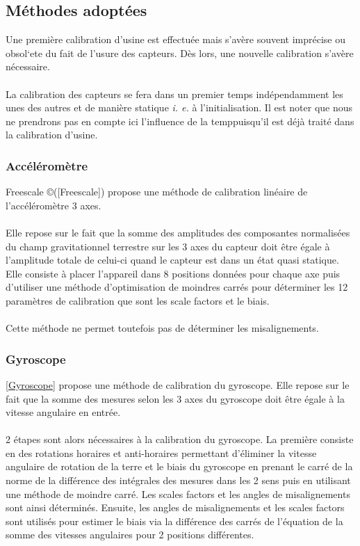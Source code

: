 \subsection{M\'ethodes adopt\'ees}

	Une premi\`ere calibration d'usine est effectu\'ee mais s'av\`ere souvent impr\'ecise ou obsol`ete du fait de l'usure des capteurs. D\`es lors, une nouvelle calibration s'av\`ere n\'ecessaire.
\\
\\
	La calibration des capteurs se fera dans un premier temps ind\'ependamment les unes des autres et de mani\`ere statique \emph{i. e.} \`a l'initialisation. Il est \a noter que nous ne prendrons pas en compte ici l'influence de la temp\erature puisqu'il est d\'ej\`a trait\'e dans la calibration d'usine.

\subsubsection{Acc\'el\'erom\`etre}

	Freescale \copyright ([Freescale]) propose une m\'ethode de calibration lin\'eaire de l'acc\'el\'erom\`etre 3 axes.
\\
\\
	Elle repose sur le fait que la somme des amplitudes des composantes normalis\'ees du champ gravitationnel terrestre sur les 3 axes du capteur doit \^etre \'egale \`a l'amplitude totale de celui-ci quand le capteur est dans un \'etat quasi statique. Elle consiste \`a placer l'appareil dans 8 positions donn\'ees pour chaque axe puis d'utiliser une m\'ethode d'optimisation de moindres carr\'es pour d\'eterminer les 12 param\`etres de calibration que sont les scale factors et le biais.
\\
\\
Cette m\'ethode ne permet toutefois pas de d\'eterminer les misalignements. 

\subsubsection{Gyroscope}

	\ref{Gyroscope} propose une m\'ethode de calibration du gyroscope. Elle repose sur le fait que la somme des mesures selon les 3 axes du gyroscope doit \^etre \'egale \`a la vitesse angulaire en entr\'ee. 
\\
\\
	2 \'etapes sont alors n\'ecessaires \`a la calibration du gyroscope. La premi\`ere consiste en des rotations horaires et anti-horaires permettant d'\'eliminer la vitesse angulaire de rotation de la terre et le biais du gyroscope en prenant le carr\'e de la norme de la diff\'erence des int\'egrales des mesures dans les 2 sens puis en utilisant une m\'ethode de moindre carr\'e. Les scales factors et les angles de misalignements sont ainsi d\'etermin\'es. Ensuite, les angles de misalignements et les scales factors sont utilis\'es pour estimer le biais via la diff\'erence des carr\'es de l'\'equation de la somme des vitesses angulaires pour 2 positions diff\'erentes.

